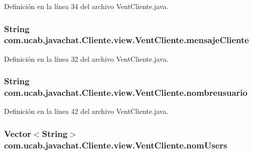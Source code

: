 Definición en la línea 34 del archivo Vent\-Cliente.\-java.

\hypertarget{classcom_1_1ucab_1_1javachat_1_1_cliente_1_1view_1_1_vent_cliente_ace603261d388c755e279d77d83a9cccb}{
\subsubsection[{mensaje\-Cliente}]{\setlength{\rightskip}{0pt plus 5cm}String com.\-ucab.\-javachat.\-Cliente.\-view.\-Vent\-Cliente.\-mensaje\-Cliente}}\label{classcom_1_1ucab_1_1javachat_1_1_cliente_1_1view_1_1_vent_cliente_ace603261d388c755e279d77d83a9cccb}


Definición en la línea 32 del archivo Vent\-Cliente.\-java.

\hypertarget{classcom_1_1ucab_1_1javachat_1_1_cliente_1_1view_1_1_vent_cliente_ad922d8637f46a059a345c80f3d599ddc}{
\subsubsection[{nombreusuario}]{\setlength{\rightskip}{0pt plus 5cm}String com.\-ucab.\-javachat.\-Cliente.\-view.\-Vent\-Cliente.\-nombreusuario}}\label{classcom_1_1ucab_1_1javachat_1_1_cliente_1_1view_1_1_vent_cliente_ad922d8637f46a059a345c80f3d599ddc}


Definición en la línea 42 del archivo Vent\-Cliente.\-java.

\hypertarget{classcom_1_1ucab_1_1javachat_1_1_cliente_1_1view_1_1_vent_cliente_a9a84788d98e20e415acc5fbabfd3486a}{
\subsubsection[{nom\-Users}]{\setlength{\rightskip}{0pt plus 5cm}Vector$<$String$>$ com.\-ucab.\-javachat.\-Cliente.\-view.\-Vent\-Cliente.\-nom\-Users}}\label{classcom_1_1ucab_1_1javachat_1_1_cliente_1_1view_1_1_vent_cliente_a9a84788d98e20e415acc5fbabfd3486a}


